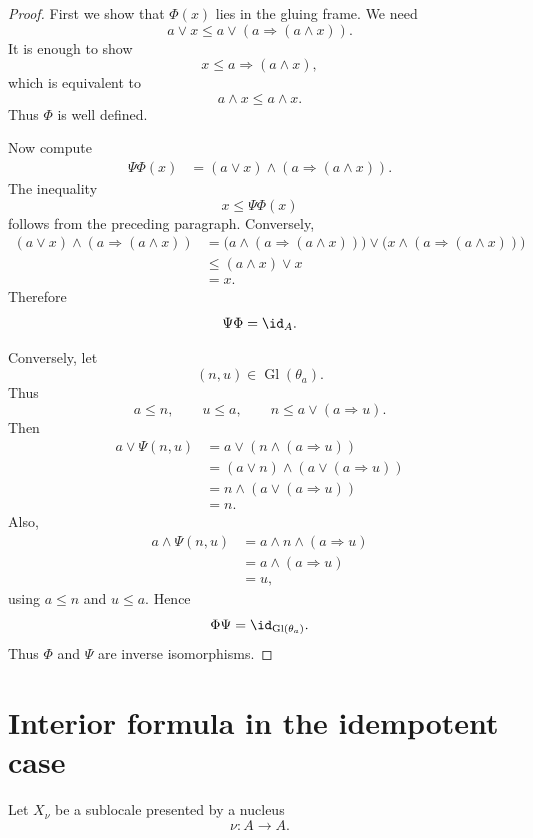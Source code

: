 \begin{proof}
First we show that \(\Phi(x)\) lies in the gluing frame.  We need
\[
    a\vee x
    \leq
    a\vee(a\Rightarrow(a\wedge x)).
\]
It is enough to show
\[
    x\leq a\Rightarrow(a\wedge x),
\]
which is equivalent to
\[
    a\wedge x\leq a\wedge x.
\]
Thus \(\Phi\) is well defined.

Now compute
\[
\begin{aligned}
    \Psi\Phi(x)
    &=
    (a\vee x)\wedge(a\Rightarrow(a\wedge x)).
\end{aligned}
\]
The inequality
\[
    x\leq\Psi\Phi(x)
\]
follows from the preceding paragraph.  Conversely,
\[
\begin{aligned}
    (a\vee x)\wedge(a\Rightarrow(a\wedge x))
    &=
    \bigl(a\wedge(a\Rightarrow(a\wedge x))\bigr)
    \vee
    \bigl(x\wedge(a\Rightarrow(a\wedge x))\bigr)\\
    &\leq
    (a\wedge x)\vee x\\
    &=
    x.
\end{aligned}
\]
Therefore
\[
    \Psi\Phi=\id_A.
\]

Conversely, let
\[
    (n,u)\in\operatorname{Gl}(\theta_a).
\]
Thus
\[
    a\leq n,
    \qquad
    u\leq a,
    \qquad
    n\leq a\vee(a\Rightarrow u).
\]
Then
\[
\begin{aligned}
    a\vee\Psi(n,u)
    &=
    a\vee(n\wedge(a\Rightarrow u))\\
    &=
    (a\vee n)\wedge(a\vee(a\Rightarrow u))\\
    &=
    n\wedge(a\vee(a\Rightarrow u))\\
    &=
    n.
\end{aligned}
\]
Also,
\[
\begin{aligned}
    a\wedge\Psi(n,u)
    &=
    a\wedge n\wedge(a\Rightarrow u)\\
    &=
    a\wedge(a\Rightarrow u)\\
    &=
    u,
\end{aligned}
\]
using \(a\leq n\) and \(u\leq a\).  Hence
\[
    \Phi\Psi=\id_{\operatorname{Gl}(\theta_a)}.
\]
Thus \(\Phi\) and \(\Psi\) are inverse isomorphisms.
\end{proof}

\section{Interior formula in the idempotent case}
\label{sec:idempotent-interior-formula}

Let \(X_\nu\) be a sublocale presented by a nucleus
\[
    \nu:A\to A.
\]

